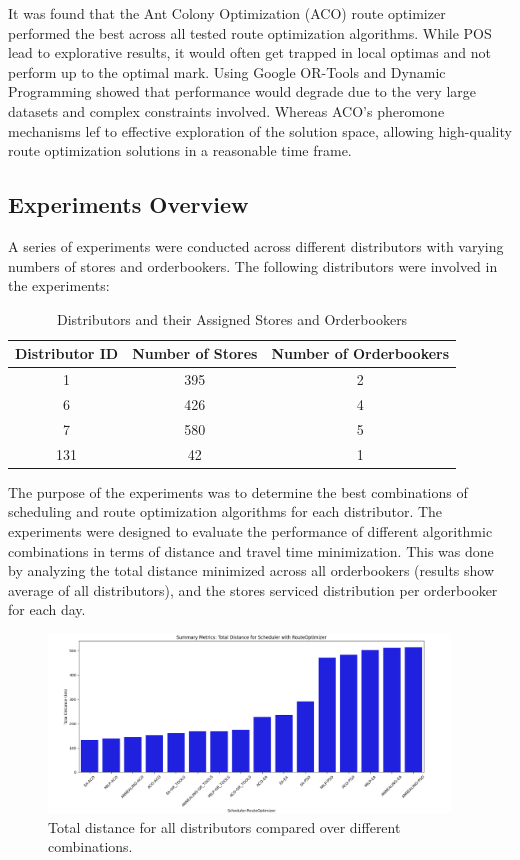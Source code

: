 It was found that the Ant Colony Optimization (ACO) route optimizer performed the best across all tested route optimization algorithms.
While POS lead to explorative results, it would often get trapped in local optimas and not perform up to the optimal mark. Using Google OR-Tools and 
Dynamic Programming showed that performance would degrade due to the very large datasets and complex constraints involved. Whereas ACO's 
pheromone mechanisms lef to effective exploration of the solution space, allowing high-quality route optimization solutions in a reasonable time frame.
\subsection{Experiments Overview}
A series of experiments were conducted across different distributors with varying numbers of stores and orderbookers. The following distributors were involved in the experiments:
\begin{table}[h!]
\centering
\begin{tabular}{|c|c|c|}
\hline
\textbf{Distributor ID} & \textbf{Number of Stores} & \textbf{Number of Orderbookers} \\
\hline
1 & 395 & 2 \\
6 & 426 & 4 \\
7 & 580 & 5 \\
131 & 42 & 1 \\
\hline
\end{tabular}
\caption{Distributors and their Assigned Stores and Orderbookers}
\end{table}

The purpose of the experiments was to determine the best combinations of scheduling and route optimization algorithms for each distributor. The experiments were designed to evaluate the performance of different algorithmic combinations in terms of distance and travel time minimization.
This was done by analyzing the total distance minimized across all orderbookers (results show average of all distributors), and the stores serviced distribution per orderbooker for each day.

\begin{figure}[H]
    \centering
    \includegraphics[width=0.95\textwidth]{images/results_distance_all_dis}
    \caption{Total distance for all distributors compared over different combinations.}
    \label{fig:results_distance_all_dis}
\end{figure}

